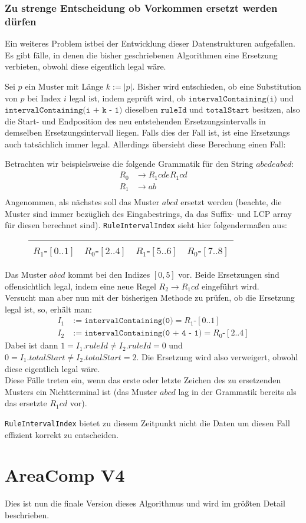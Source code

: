 \subsubsection{Zu strenge Entscheidung ob Vorkommen ersetzt werden dürfen}

Ein weiteres Problem istbei der Entwicklung dieser Datenstrukturen aufgefallen. Es gibt fälle, in denen die bisher geschriebenen Algorithmen eine Ersetzung verbieten, obwohl diese eigentlich legal wäre.

Sei $p$ ein Muster mit Länge $k := |p|$. Bisher wird entschieden, ob eine Substitution von $p$ bei Index $i$ legal ist, indem geprüft wird, ob $\texttt{intervalContaining(i)}$ und $\texttt{intervalContaining(i + k - 1)}$ dieselben $\texttt{ruleId}$ und $\texttt{totalStart}$ besitzen, also die Start- und Endposition des neu entstehenden Ersetzungsintervalls in demselben Ersetzungsintervall liegen. Falls dies der Fall ist, ist eine Ersetzungs auch tatsächlich immer legal. Allerdings übersieht diese Berechung einen Fall:

Betrachten wir beispielsweise die folgende Grammatik für den String $abcdeabcd$:
\begin{align*}
	R_0 &\rightarrow R_1 c d e R_1 c d\\
	R_1 &\rightarrow a b\\
\end{align*}
Angenommen, als nächstes soll das Muster $abcd$ ersetzt werden (beachte, die Muster sind immer bezüglich des Eingabestrings, da das Suffix- und LCP array für diesen berechnet sind).
\texttt{RuleIntervalIndex} sieht hier folgendermaßen aus:
\begin{figure}[H]
	\centering
	\begin{tabular}{|c|c|c|c|} \hline
		$R_1$-$[0..1]$ & $R_0$-$[2..4]$ & $R_1$-$[5..6]$ & $R_0$-$[7..8]$ \\\hline
	\end{tabular}
\end{figure}

Das Muster $abcd$ kommt bei den Indizes $[0, 5]$ vor. Beide Ersetzungen sind offensichtlich legal, indem eine neue Regel $R_2 \rightarrow R_1cd$ eingeführt wird.\\ Versucht man aber nun mit der bisherigen Methode zu prüfen, ob die Ersetzung legal ist, so, erhält man:
\begin{align*}
	I_1 &:= \texttt{intervalContaining(0)} = R_1\text{-}[0..1]\\
	I_2 &:= \texttt{intervalContaining(0 + 4 - 1)} = R_0\text{-}[2..4]
\end{align*} 
Dabei ist dann $1 = I_1.ruleId \neq I_2.ruleId = 0$ und $0 = I_1.totalStart \neq I_2.totalStart = 2$. Die Ersetzung wird also verweigert, obwohl diese eigentlich legal wäre.\\
Diese Fälle treten ein, wenn das erste oder letzte Zeichen des zu ersetzenden Musters ein Nichtterminal ist (das Muster $abcd$ lag in der Grammatik bereits als das ersetzte $R_1 cd$ vor).

\texttt{RuleIntervalIndex} bietet zu diesem Zeitpunkt nicht die Daten um diesen Fall effizient korrekt zu entscheiden.

\section{AreaComp V4}

Dies ist nun die finale Version dieses Algorithmus und wird im größten Detail beschrieben.